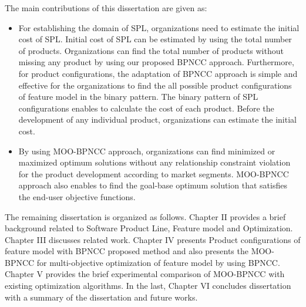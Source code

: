 The main contributions of this dissertation are given as:
\begin{itemize}
	\item For establishing the domain of SPL, organizations need to estimate the initial cost of SPL. Initial cost of SPL can be estimated by using the total number of products. Organizations can find the total number of products without missing any product by using our proposed BPNCC approach. Furthermore, for product configurations, the adaptation of BPNCC approach is simple and effective for the organizations to find the all possible product configurations of feature model in the binary pattern. The binary pattern of SPL configurations enables to calculate the cost of each product. Before the development of any individual product, organizations can estimate the initial cost.
	
	\item By using MOO-BPNCC approach, organizations can find minimized or maximized optimum solutions without any relationship constraint violation for the product development according to market segments. MOO-BPNCC approach also enables to find the goal-base optimum solution that satisfies the end-user objective functions. 
	
\end{itemize}               

The remaining dissertation is organized as follows. Chapter II provides a brief background related to Software Product Line, Feature model and Optimization. Chapter III discusses related work. Chapter IV presents Product configurations of feature model with BPNCC proposed method and also presents the MOO-BPNCC for multi-objective optimization of feature model by using BPNCC. Chapter V provides the brief experimental comparison of MOO-BPNCC with existing optimization algorithms. In the last, Chapter VI concludes dissertation with a summary of the dissertation and future works.